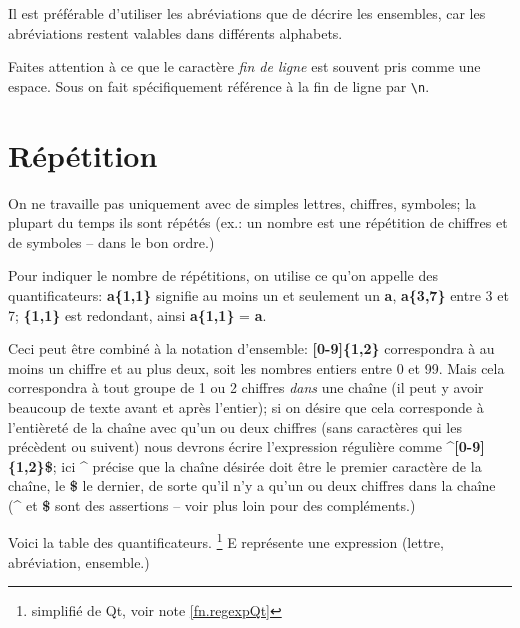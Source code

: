 Il est préférable d'utiliser les abréviations que de décrire les ensembles, car les abréviations restent valables dans différents alphabets.

Faites attention à ce que le caractère \emph{fin de ligne} est souvent pris comme une espace. Sous \Tw{} on fait spécifiquement référence à la fin de ligne par \og\verb|\n|\fg.

\section{Répétition}

On ne travaille pas uniquement avec de simples lettres, chiffres, symboles; la plupart du temps ils sont répétés (ex.: un nombre est une répétition de chiffres et de symboles -- dans le bon ordre.)

Pour indiquer le nombre de répétitions, on utilise ce qu'on appelle des \og quantificateurs\fg: \textbf{a\{1,1\}} signifie au moins un et seulement un \textbf{a}, \textbf{a\{3,7\}} entre 3 et 7; \textbf{\{1,1\}} est redondant, ainsi \textbf{a\{1,1\}} = \textbf{a}.

Ceci peut être combiné à la notation d'ensemble: \textbf{[0-9]\{1,2\}} correspondra à au moins un chiffre et au plus deux, soit les nombres entiers entre 0 et 99. Mais cela correspondra à tout groupe de 1 ou 2 chiffres \emph{dans} une chaîne (il peut y avoir beaucoup de texte avant et après l'entier); si on désire que cela corresponde à l'entièreté de la chaîne avec qu'un ou deux chiffres (sans caractères qui les précèdent ou suivent) nous devrons écrire l'expression régulière comme \textbf{\^{}[0-9]\{1,2\}\$}; ici \textbf{\^{}} précise que la chaîne désirée doit être le premier caractère de la chaîne, le \textbf{\$} le dernier, de sorte qu'il n'y a qu'un ou deux chiffres dans la chaîne (\textbf{\^{}} et \textbf{\$} sont des \og assertions\fg{} -- voir plus loin pour des compléments.)

Voici la table des quantificateurs. \footnote{simplifié de Qt, voir note \ref{fn.regexpQt}} E représente une expression (lettre, abréviation, ensemble.)
\smallskip

